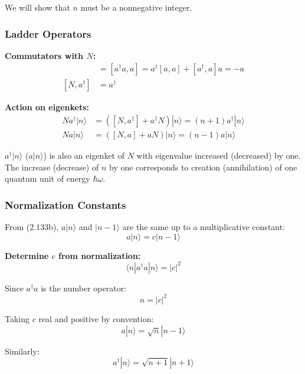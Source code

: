 \documentclass[11pt,a4paper]{article}
\begin{document}
We will show that $n$ must be a nonnegative integer.

\subsubsection{Ladder Operators}

\textbf{Commutators with $N$:}
\begin{align}
[N, a] &= [a^\dagger a, a] = a^\dagger[a,a] + [a^\dagger, a]a = -a \tag{2.131} \\
[N, a^\dagger] &= a^\dagger \tag{2.132}
\end{align}

\textbf{Action on eigenkets:}
\begin{align}
Na^\dagger|n\rangle &= ([N,a^\dagger] + a^\dagger N)|n\rangle = (n+1)a^\dagger|n\rangle \tag{2.133a} \\
Na|n\rangle &= ([N,a] + aN)|n\rangle = (n-1)a|n\rangle \tag{2.133b}
\end{align}

$a^\dagger|n\rangle$ ($a|n\rangle$) is also an eigenket of $N$ with eigenvalue increased (decreased) by one. The increase (decrease) of $n$ by one corresponds to creation (annihilation) of one quantum unit of energy $\hbar\omega$.

\subsubsection{Normalization Constants}

From (2.133b), $a|n\rangle$ and $|n-1\rangle$ are the same up to a multiplicative constant:
\begin{equation}
a|n\rangle = c|n-1\rangle
\tag{2.134}
\end{equation}

\textbf{Determine $c$ from normalization:}
\begin{equation}
\langle n|a^\dagger a|n\rangle = |c|^2
\tag{2.135}
\end{equation}

Since $a^\dagger a$ is the number operator:
\begin{equation}
n = |c|^2
\tag{2.136}
\end{equation}

Taking $c$ real and positive by convention:
\begin{equation}
\boxed{a|n\rangle = \sqrt{n}|n-1\rangle}
\tag{2.137}
\end{equation}

Similarly:
\begin{equation}
\boxed{a^\dagger|n\rangle = \sqrt{n+1}|n+1\rangle}
\tag{2.138}
\end{equation}
\end{document}
